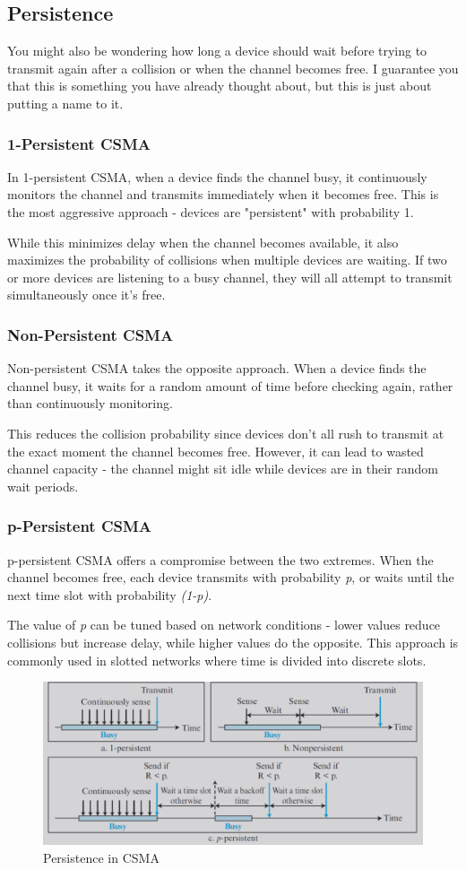 \subsection{Persistence}
You might also be wondering how long a device should wait before trying to transmit again after a collision or when the channel becomes free. I guarantee you that this is something you have already thought about, but this is just about putting a name to it. 


\subsubsection{1-Persistent CSMA}
In 1-persistent CSMA, when a device finds the channel busy, it continuously monitors the channel and transmits immediately when it becomes free. This is the most aggressive approach - devices are "persistent" with probability 1.

While this minimizes delay when the channel becomes available, it also maximizes the probability of collisions when multiple devices are waiting. If two or more devices are listening to a busy channel, they will all attempt to transmit simultaneously once it's free.

\subsubsection{Non-Persistent CSMA}
Non-persistent CSMA takes the opposite approach. When a device finds the channel busy, it waits for a random amount of time before checking again, rather than continuously monitoring.

This reduces the collision probability since devices don't all rush to transmit at the exact moment the channel becomes free. However, it can lead to wasted channel capacity - the channel might sit idle while devices are in their random wait periods.

\subsubsection{p-Persistent CSMA}
p-persistent CSMA offers a compromise between the two extremes. When the channel becomes free, each device transmits with probability \textit{p}, or waits until the next time slot with probability \textit{(1-p)}.

The value of \textit{p} can be tuned based on network conditions - lower values reduce collisions but increase delay, while higher values do the opposite. This approach is commonly used in slotted networks where time is divided into discrete slots.

\begin{figure}[h]
    \centering
    \includegraphics[width=.8\textwidth]{assets/osi/datalink/csma/persistence.png}
    \caption{Persistence in CSMA}
    \label{fig:csma-persistence}
\end{figure}